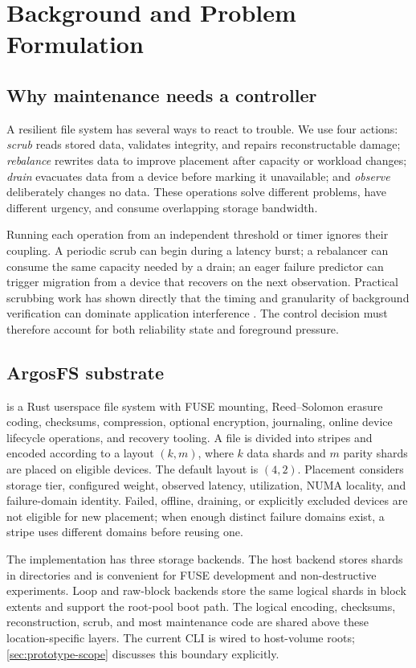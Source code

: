\section{Background and Problem Formulation}
\label{sec:background}

\subsection{Why maintenance needs a controller}
A resilient file system has several ways to react to trouble. We use four actions: \emph{scrub} reads stored data, validates integrity, and repairs reconstructable damage; \emph{rebalance} rewrites data to improve placement after capacity or workload changes; \emph{drain} evacuates data from a device before marking it unavailable; and \emph{observe} deliberately changes no data. These operations solve different problems, have different urgency, and consume overlapping storage bandwidth.

Running each operation from an independent threshold or timer ignores their coupling. A periodic scrub can begin during a latency burst; a rebalancer can consume the same capacity needed by a drain; an eager failure predictor can trigger migration from a device that recovers on the next observation. Practical scrubbing work has shown directly that the timing and granularity of background verification can dominate application interference \citep{amvrosiadis2012scrubbing}. The control decision must therefore account for both reliability state and foreground pressure.

\subsection{ArgosFS substrate}
\label{sec:argosfs-background}
\argosfs{} is a Rust userspace file system with FUSE mounting, Reed--Solomon erasure coding, checksums, compression, optional encryption, journaling, online device lifecycle operations, and recovery tooling. A file is divided into stripes and encoded according to a layout $(k,m)$, where $k$ data shards and $m$ parity shards are placed on eligible devices. The default layout is $(4,2)$. Placement considers storage tier, configured weight, observed latency, utilization, NUMA locality, and failure-domain identity. Failed, offline, draining, or explicitly excluded devices are not eligible for new placement; when enough distinct failure domains exist, a stripe uses different domains before reusing one.

The implementation has three storage backends. The host backend stores shards in directories and is convenient for FUSE development and non-destructive experiments. Loop and raw-block backends store the same logical shards in block extents and support the root-pool boot path. The logical encoding, checksums, reconstruction, scrub, and most maintenance code are shared above these location-specific layers. The current \autopilot{} CLI is wired to host-volume roots; \cref{sec:prototype-scope} discusses this boundary explicitly.

